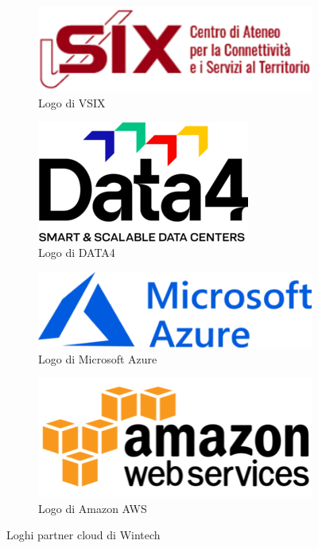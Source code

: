 \begin{figure}[htbp]
    \centering
    \begin{subfigure}[b]{0.4\linewidth}
        \centering
        \includegraphics[width=\linewidth]{images/loghi/vsix.png}
        \caption{Logo di VSIX}
        \label{fig:logo-vsix}
    \end{subfigure}
    \hfill
    \begin{subfigure}[b]{0.4\linewidth}
        \centering
        \includegraphics[width=0.6\linewidth]{images/loghi/data4.png}
        \caption{Logo di DATA4}
        \label{fig:logo-data4}
    \end{subfigure}
    \hfill
    \begin{subfigure}[b]{0.4\linewidth}
        \centering
        \includegraphics[width=\linewidth]{images/loghi/azure.png}
        \caption{Logo di Microsoft Azure}
        \label{fig:logo-azure}
    \end{subfigure}
    \hfill
    \begin{subfigure}[b]{0.4\linewidth}
        \centering
        \includegraphics[width=0.8\linewidth]{images/loghi/aws.png}
        \caption{Logo di Amazon AWS}
        \label{fig:logo-aws}
    \end{subfigure}
    \caption{Loghi partner cloud di Wintech}
    \label{fig:partner-cloud}
\end{figure}

